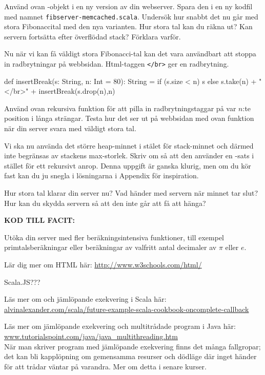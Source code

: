 \Subtask Använd ovan -objekt i en ny version av din webserver. Spara den i en ny kodfil med namnet \texttt{fibserver-memcached.scala}. Undersök hur snabbt det nu går med stora Fibonaccital med den nya varianten. Hur stora tal kan du räkna ut? Kan servern fortsätta efter överflödad stack? Förklara varför.

\Subtask Nu när vi kan få väldigt stora Fibonacci-tal kan det vara användbart att stoppa in radbrytningar på webbsidan. Html-taggen \texttt{</br>} ger en radbrytning. 
\begin{Code}
  def insertBreak(s: String, n: Int = 80): String = {
    if (s.size < n) s 
    else s.take(n) + "</br>" + insertBreak(s.drop(n),n)
  }
\end{Code}
Använd ovan rekursiva funktion för att pilla in radbrytningstaggar på var $n$:te position i långa strängar. Testa hur det ser ut på webbsidan med ovan funktion när din server svara med väldigt stora tal.

\Subtask Vi ska nu använda det större heap-minnet i stälet för stack-minnet och därmed inte begränsas av stackens max-storlek. Skriv om  så att den använder en -sats i stället för ett rekursivt anrop. Denna uppgift är ganska klurig, men om du kör fast kan du ju snegla i lösningarna i Appendix för inspiration. 

Hur stora tal klarar din server nu? Vad händer med servern när minnet tar slut? Hur kan du skydda servern så att den inte går att få att hänga?

\textbf{KOD TILL FACIT:}

\Task Utöka din server med fler beräkningsintensiva funktioner, till exempel primtalsberäkningar eller beräkningar av valfritt antal decimaler av $\pi$ eller $e$.

\Task Lär dig mer om HTML här: \url{http://www.w3schools.com/html/}

\Task Scala.JS???


\Task Läs mer om  och jämlöpande exekvering i Scala här:\\
\href{http://alvinalexander.com/scala/future-example-scala-cookbook-oncomplete-callback}{alvinalexander.com/scala/future-example-scala-cookbook-oncomplete-callback}

\Task Läs mer om jämlöpande exekvering och multitrådade program i Java här: \href{http://www.tutorialspoint.com/java/java_multithreading.htm}{www.tutorialspoint.com/java/java\_multithreading.htm}  \\
\noindent När man skriver program med jämlöpande exekvering finns det många fallgropar; det kan bli kapplöpning  om gemensamma resurser och dödläge  där inget händer för att trådar väntar på varandra. Mer om detta i senare kurser. 

